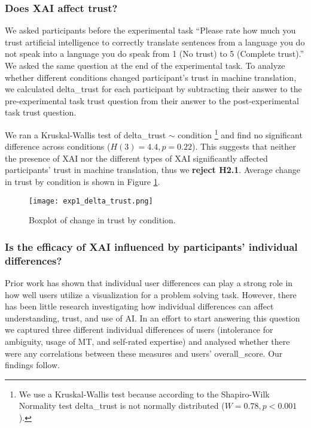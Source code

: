\subsubsection{Does XAI affect trust?}

We asked participants before the experimental task “Please rate how much you trust artificial intelligence to correctly translate sentences from a language you do not speak into a language you do speak from 1 (No trust) to 5 (Complete trust).”  We asked the same question at the end of the experimental task. To analyze whether different conditions changed participant’s trust in machine translation, we calculated delta\_trust for each participant by subtracting their answer to the pre-experimental task trust question from their answer to the post-experimental task trust question. 
 
We ran a Kruskal-Wallis test of delta\_trust $\sim$ condition \footnote{We use a Kruskal-Wallis test because according to the Shapiro-Wilk Normality test delta_trust is not normally distributed ($W = 0.78, p < 0.001$).} and find no significant difference across conditions ($H(3) = 4.4, p = 0.22$). This suggests that neither the presence of XAI nor the different types of XAI significantly affected participants’ trust in machine translation, thus we \textbf{reject H2.1}. Average change in trust by condition is shown in Figure \ref{fig:exp1_delta_trust}.

\begin{figure}[h!]
    \centering
    \texttt{[image: exp1\_delta\_trust.png]}
    \caption{Boxplot of change in trust by condition.}
    \label{fig:exp1_delta_trust}
\end{figure}

\subsubsection{Is the efficacy of XAI influenced by participants' individual differences?}

Prior work has shown that individual user differences can play a strong role in how well users utilize a visualization for a problem solving task\cite{liuSurvey2020}. However, there has been little research investigating how individual differences can affect understanding, trust, and use of AI. In an effort to start answering this question we captured three different individual differences of users (intolerance for ambiguity, usage of MT, and self-rated expertise) and analysed whether there were any correlations between these measures and users’ overall\_score. Our findings follow. 

